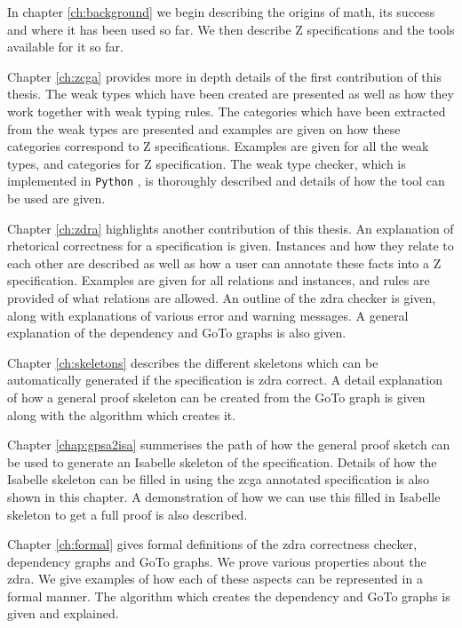 In chapter \ref{ch:background} we begin describing the origins of \gls{math}, its success and where it has been used so far. We then describe Z specifications and the tools available for it so far.


Chapter \ref{ch:zcga} provides more in depth details of the first contribution of this thesis. The weak types which have been created are presented as well as how they work together with weak typing rules. The categories which have been extracted from the weak types are presented and examples are given on how these categories correspond to Z specifications. Examples are given for all the weak types, and categories for Z specification. The weak type checker, which is implemented in \texttt{Python} \cite{Python}, is thoroughly described and details of how the tool can be used are given.

Chapter \ref{ch:zdra} highlights another contribution of this thesis. An explanation of rhetorical correctness for a specification is given. Instances and how they relate to each other are described as well as how a user can annotate these facts into a Z specification. Examples are given for all relations and instances, and rules are provided of what relations are allowed. An outline of the \gls{zdra} checker is given, along with explanations of various error and warning messages. A general explanation of the dependency and GoTo graphs is also given.

Chapter \ref{ch:skeletons} describes the different skeletons which can be automatically generated if the specification is \gls{zdra} correct. A detail explanation of how a general proof skeleton can be created from the GoTo graph is given along with the algorithm which creates it. 

Chapter \ref{chap:gpsa2isa} summerises the path of how the general proof sketch can be used to generate an Isabelle skeleton of the specification. Details of how the Isabelle skeleton can be filled in using the \gls{zcga} annotated specification is also shown in this chapter. A demonstration of how we can use this filled in Isabelle skeleton to get a full proof is also described.

Chapter \ref{ch:formal} gives formal definitions of the \gls{zdra} correctness checker, dependency graphs and GoTo graphs. We prove various properties about the \gls{zdra}. We give examples of how each of these aspects can be represented in a formal manner. The algorithm which creates the dependency and GoTo graphs is given and explained.

